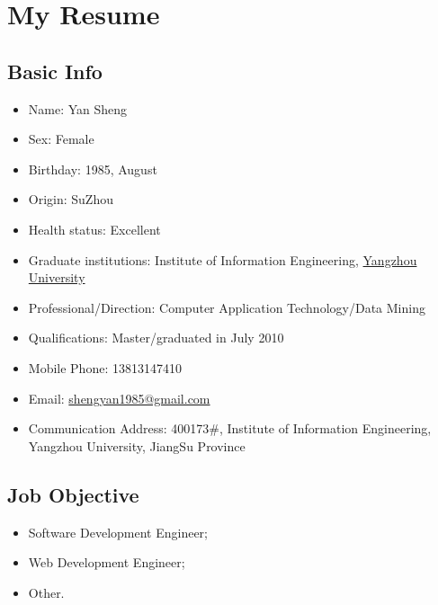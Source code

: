 \documentclass[a4paper,10pt,english]{manual}
\begin{document}
\chapter{My Resume}
\section{Basic Info}
\begin{itemize}
\item {} 
Name: Yan Sheng

\item {} 
Sex: Female

\item {} 
Birthday: 1985, August

\item {} 
Origin: SuZhou

\item {} 
Health status: Excellent

\item {} 
Graduate institutions: Institute of Information Engineering, \href{http://www.yzu.edu.cn}{Yangzhou University}

\item {} 
Professional/Direction: Computer Application Technology/Data Mining

\item {} 
Qualifications: Master/graduated in July 2010

\item {} 
Mobile Phone: 13813147410

\item {} 
Email: \href{mailto:shengyan1985@gmail.com}{shengyan1985@gmail.com}

\item {} 
Communication Address: 400173\#, Institute of Information Engineering, Yangzhou University, JiangSu Province

\end{itemize}

\section{Job Objective}
\begin{itemize}
\item {} 
Software Development Engineer;

\item {} 
Web Development Engineer;

\item {} 
Other.

\end{itemize}
\end{document}
